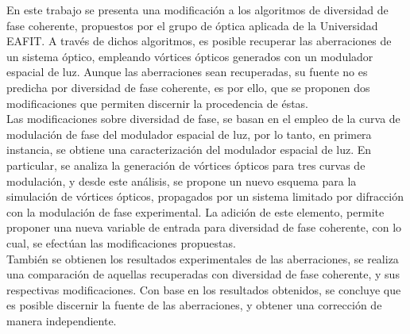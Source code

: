 {En este trabajo se presenta una modificación a los algoritmos de diversidad de fase coherente, propuestos por el grupo de óptica aplicada de la Universidad EAFIT. A través de dichos algoritmos, es posible recuperar las aberraciones de un sistema óptico, empleando vórtices ópticos generados con un modulador espacial de luz. Aunque las aberraciones sean recuperadas, su fuente no es predicha por diversidad de fase coherente, es por ello, que se proponen dos modificaciones que permiten discernir la procedencia de éstas.\\


Las modificaciones sobre diversidad de fase, se basan en el empleo de la curva de modulación de fase del modulador espacial de luz, por lo tanto, en primera instancia, se obtiene una caracterización del modulador espacial de luz. En particular, se analiza la generación de vórtices ópticos para tres curvas de modulación, y desde este análisis, se propone un nuevo esquema para la simulación de vórtices ópticos, propagados por un sistema limitado por difracción con la modulación de fase experimental. La adición de este elemento, permite proponer una nueva variable de entrada para diversidad de fase coherente, con lo cual, se efectúan las modificaciones propuestas.\\

También se obtienen los resultados experimentales de las aberraciones, se realiza una comparación de aquellas recuperadas con diversidad de fase coherente, y sus respectivas modificaciones. Con base en los resultados obtenidos, se concluye que es posible discernir la fuente de las aberraciones, y obtener una corrección de manera independiente.}




